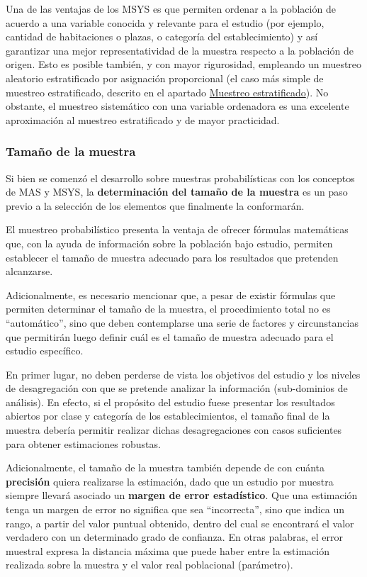 \documentclass[
]{book}
\begin{document}
Una de las ventajas de los MSYS es que permiten ordenar a la población de acuerdo a una variable conocida y relevante para el estudio (por ejemplo, cantidad de habitaciones o plazas, o categoría del establecimiento) y así garantizar una mejor representatividad de la muestra respecto a la población de origen. Esto es posible también, y con mayor rigurosidad, empleando un muestreo aleatorio estratificado por asignación proporcional (el caso más simple de muestreo estratificado, descrito en el apartado \protect\hyperlink{muestreo-estratificado}{Muestreo estratificado}). No obstante, el muestreo sistemático con una variable ordenadora es una excelente aproximación al muestreo estratificado y de mayor practicidad.

\hypertarget{tamauxf1o-de-la-muestra}{%
\subsubsection{Tamaño de la muestra}\label{tamauxf1o-de-la-muestra}}

Si bien se comenzó el desarrollo sobre muestras probabilísticas con los conceptos de MAS y MSYS, la \textbf{determinación del tamaño de la muestra} es un paso previo a la selección de los elementos que finalmente la conformarán.

El muestreo probabilístico presenta la ventaja de ofrecer fórmulas matemáticas que, con la ayuda de información sobre la población bajo estudio, permiten establecer el tamaño de muestra adecuado para los resultados que pretenden alcanzarse.

Adicionalmente, es necesario mencionar que, a pesar de existir fórmulas que permiten determinar el tamaño de la muestra, el procedimiento total no es ``automático'', sino que deben contemplarse una serie de factores y circunstancias que permitirán luego definir cuál es el tamaño de muestra adecuado para el estudio específico.

En primer lugar, no deben perderse de vista los objetivos del estudio y los niveles de desagregación con que se pretende analizar la información (sub-dominios de análisis). En efecto, si el propósito del estudio fuese presentar los resultados abiertos por clase y categoría de los establecimientos, el tamaño final de la muestra debería permitir realizar dichas desagregaciones con casos suficientes para obtener estimaciones robustas.

Adicionalmente, el tamaño de la muestra también depende de con cuánta \textbf{precisión} quiera realizarse la estimación, dado que un estudio por muestra siempre llevará asociado un \textbf{margen de error estadístico}. Que una estimación tenga un margen de error no significa que sea ``incorrecta'', sino que indica un rango, a partir del valor puntual obtenido, dentro del cual se encontrará el valor verdadero con un determinado grado de confianza. En otras palabras, el error muestral expresa la distancia máxima que puede haber entre la estimación realizada sobre la muestra y el valor real poblacional (parámetro).
\end{document}
